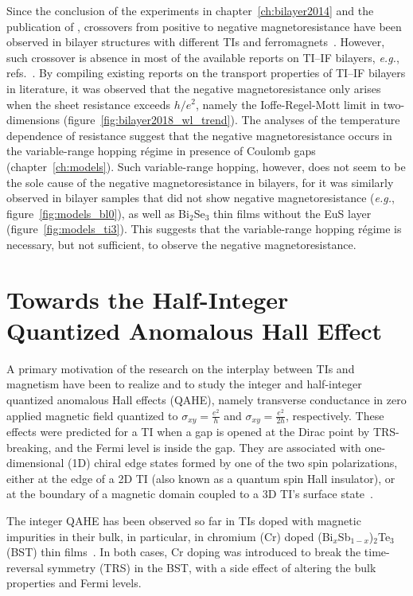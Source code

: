 Since the conclusion of the experiments in chapter~\ref{ch:bilayer2014} and the publication of \cite{bilayer2014}, crossovers from positive to negative magnetoresistance have been observed in bilayer structures with different TIs and ferromagnets~\cite{Samarth2017, Tian2016}. However, such crossover is absence in most of the available reports on TI--IF bilayers, \textit{e.g.}, refs.~\cite{Shi2014, Petta2014, Wang2014, Tian2016, Qiu2017}. By compiling existing reports on the transport properties of TI--IF bilayers in literature, it was observed that the negative magnetoresistance only arises when the sheet resistance exceeds $h / e^2$, namely the Ioffe-Regel-Mott limit in two-dimensions (figure~\ref{fig:bilayer2018_wl_trend}). The analyses of the temperature dependence of resistance suggest that the negative magnetoresistance occurs in the variable-range hopping r\'egime in presence of Coulomb gaps (chapter~\ref{ch:models}). Such variable-range hopping, however, does not seem to be the sole cause of the negative magnetoresistance in bilayers, for it was similarly observed in bilayer samples that did not show negative magnetoresistance (\textit{e.g.}, figure~\ref{fig:models_bl0}), as well as Bi$_2$Se$_3$ thin films without the EuS layer (figure~\ref{fig:models_ti3}). This suggests that the variable-range hopping r\'egime is necessary, but not sufficient, to observe the negative magnetoresistance.
%
\section{Towards the Half-Integer Quantized Anomalous Hall Effect}
A primary motivation of the research on the interplay between TIs and magnetism have been to realize and to study the integer and half-integer quantized anomalous Hall effects (QAHE), namely transverse conductance in zero applied magnetic field quantized to $\sigma_{xy} = \frac{e^2}{h}$ and $\sigma_{xy} = \frac{e^2}{2h}$, respectively. These effects were predicted for a TI when a gap is opened at the Dirac point by TRS-breaking, and the Fermi level is inside the gap. They are associated with one-dimensional (1D) chiral edge states formed by one of the two spin polarizations, either at the edge of a 2D TI (also known as a quantum spin Hall insulator), or at the boundary of a magnetic domain coupled to a 3D TI's surface state~\cite{TI_Qi, TI_Col, QAH_TI_Yu}.

The integer QAHE has been observed so far in TIs doped with magnetic impurities in their bulk, in particular, in chromium (Cr) doped (Bi$_x$Sb$_{1-x}$)$_2$Te$_3$ (BST) thin films~\cite{Chang2013, Kou2014}. In both cases, Cr doping was introduced to break the time-reversal symmetry (TRS) in the BST, with a side effect of altering the bulk properties and Fermi levels.

